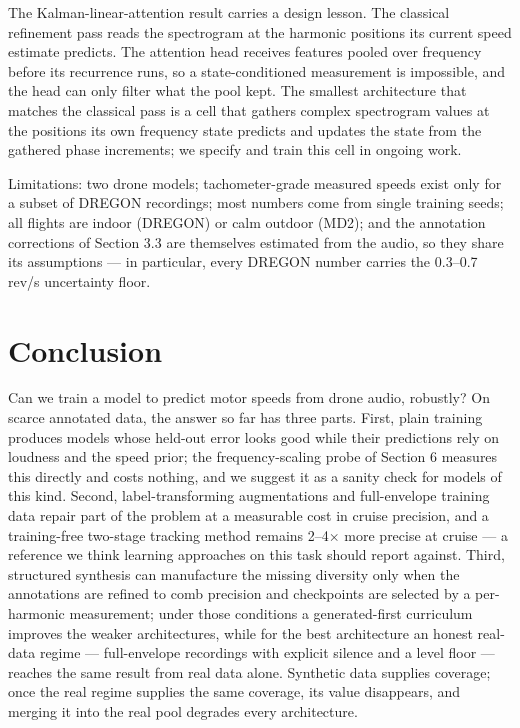 \documentclass[journal]{IEEEtran}
\begin{document}
The Kalman-linear-attention result carries a design lesson. The classical
refinement pass reads the spectrogram at the harmonic positions its
current speed estimate predicts. The attention head receives features
pooled over frequency before its recurrence runs, so a state-conditioned
measurement is impossible, and the head can only filter what the pool
kept. The smallest architecture that matches the classical pass is a cell
that gathers complex spectrogram values at the positions its own
frequency state predicts and updates the state from the gathered phase
increments; we specify and train this cell in ongoing work.

Limitations: two drone models; tachometer-grade measured speeds exist only
for a subset of DREGON recordings; most numbers come from single training
seeds; all flights are indoor (DREGON) or calm outdoor (MD2); and the
annotation corrections of Section 3.3 are themselves estimated from the
audio, so they share its assumptions --- in particular, every DREGON number
carries the 0.3--0.7 rev/s uncertainty floor.

\section{Conclusion}
\label{sec:conclusion}

Can we train a model to predict motor speeds from drone audio, robustly? On
scarce annotated data, the answer so far has three parts. First, plain
training produces models whose held-out error looks good while their
predictions rely on loudness and the speed prior; the frequency-scaling
probe of Section 6 measures this directly and costs nothing, and we suggest
it as a sanity check for models of this kind. Second, label-transforming
augmentations and full-envelope training data repair part of the problem at
a measurable cost in cruise precision, and a training-free two-stage
tracking method remains 2--4$\times$ more precise at cruise --- a reference we
think learning approaches on this task should report against. Third,
structured synthesis can manufacture the missing diversity only when the
annotations are refined to comb precision and checkpoints are selected by a
per-harmonic measurement; under those conditions a generated-first
curriculum improves the weaker architectures, while for the best
architecture an honest real-data regime --- full-envelope recordings with
explicit silence and a level floor --- reaches the same result from real
data alone. Synthetic data supplies coverage; once the real regime
supplies the same coverage, its value disappears, and merging it into the
real pool degrades every architecture.
\end{document}
